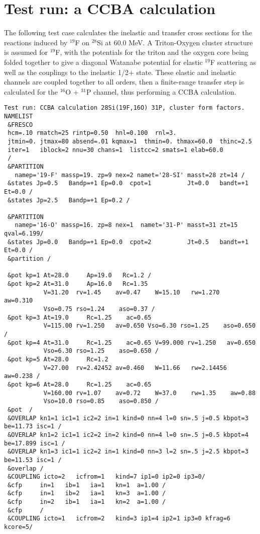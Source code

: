 \documentclass[11pt]{article}
\begin{document}
\newpage
\section{Test run: a CCBA calculation}


The following test case calculates the inelastic and transfer cross sections
for the reactions induced by $^{19}$F on $^{28}$Si at 60.0 MeV.   A Triton-Oxygen
cluster structure is assumed for $^{19}$F, with the potentials for the triton
and the oxygen core being folded together to give a diagonal Watanabe
potential for elastic $^{19}$F scattering as well as the couplings to the
inelastic 1/2+ state.
These elastic and inelastic channels are coupled together to all orders,
then a finite-range transfer step is calculated for the $^{16}$O + $^{31}$P channel,
thus performing a CCBA calculation.

{\small
\begin{verbatim}
Test run: CCBA calculation 28Si(19F,16O) 31P, cluster form factors.
NAMELIST
 &FRESCO
 hcm=.10 rmatch=25 rintp=0.50  hnl=0.100  rnl=3.
 jtmin=0. jtmax=80 absend=.01 kqmax=1  thmin=0. thmax=60.0  thinc=2.5
 iter=1   iblock=2 nnu=30 chans=1  listcc=2 smats=1 elab=60.0
 /
 &PARTITION
   namep='19-F' massp=19. zp=9 nex=2 namet='28-SI' masst=28 zt=14 /
 &states Jp=0.5   Bandp=+1 Ep=0.0  cpot=1          Jt=0.0   bandt=+1 Et=0.0 /
 &states Jp=2.5   Bandp=+1 Ep=0.2 /

 &PARTITION
   namep='16-O' massp=16. zp=8 nex=1  namet='31-P' masst=31 zt=15 qval=6.199/
 &states Jp=0.0   Bandp=+1 Ep=0.0  cpot=2          Jt=0.5   bandt=+1 Et=0.0 /
 &partition /

 &pot kp=1 At=28.0     Ap=19.0   Rc=1.2 /
 &pot kp=2 At=31.0     Ap=16.0   Rc=1.35
           V=31.20  rv=1.45    av=0.47    W=15.10   rw=1.270   aw=0.310
           Vso=0.75 rso=1.24    aso=0.37 /
 &pot kp=3 At=19.0     Rc=1.25    ac=0.65
           V=115.00 rv=1.250   av=0.650 Vso=6.30 rso=1.25    aso=0.650 /
 &pot kp=4 At=31.0     Rc=1.25    ac=0.65 V=99.000 rv=1.250   av=0.650
           Vso=6.30 rso=1.25    aso=0.650 /
 &pot kp=5 At=28.0     Rc=1.2
           V=27.00  rv=2.42452 av=0.460   W=11.66   rw=2.14456 aw=0.238 /
 &pot kp=6 At=28.0     Rc=1.25    ac=0.65
           V=160.00 rv=1.07    av=0.72    W=37.0    rw=1.35    aw=0.88
           Vso=10.0 rso=0.85    aso=0.850 /
 &pot  /
 &OVERLAP kn1=1 ic1=1 ic2=2 in=1 kind=0 nn=4 l=0 sn=.5 j=0.5 kbpot=3 be=11.73 isc=1 /
 &OVERLAP kn1=2 ic1=1 ic2=2 in=2 kind=0 nn=4 l=0 sn=.5 j=0.5 kbpot=4 be=17.899 isc=1 /
 &OVERLAP kn1=3 ic1=1 ic2=2 in=1 kind=0 nn=3 l=2 sn=.5 j=2.5 kbpot=3 be=11.53 isc=1 /
 &overlap /
 &COUPLING icto=2   icfrom=1   kind=7 ip1=0 ip2=0 ip3=0/
 &cfp     in=1   ib=1   ia=1   kn=1  a=1.00 /
 &cfp     in=1   ib=2   ia=1   kn=3  a=1.00 /
 &cfp     in=2   ib=1   ia=1   kn=2  a=1.00 /
 &cfp     /
 &COUPLING icto=1   icfrom=2   kind=3 ip1=4 ip2=1 ip3=0 kfrag=6 kcore=5/
\end{verbatim}
}
\newpage
\end{document}
